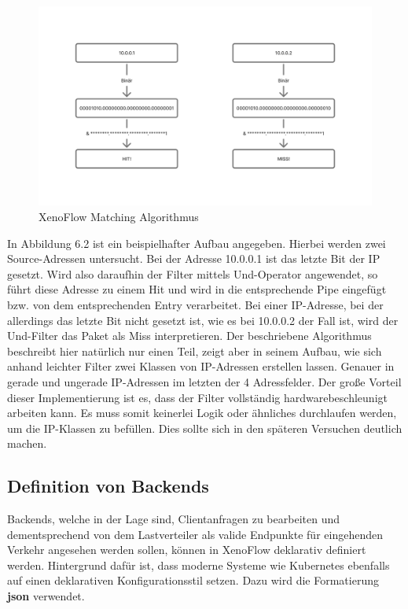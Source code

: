 \begin{figure}
    \centering
    \includegraphics[width=1.1\linewidth]{images/Filter Matching.png}
    \caption{XenoFlow Matching Algorithmus}
    \label{fig:enter-label}
\end{figure}
In Abbildung 6.2 ist ein beispielhafter Aufbau angegeben. Hierbei werden zwei Source-Adressen untersucht. Bei der Adresse 10.0.0.1 ist das letzte Bit der IP gesetzt. Wird also daraufhin der Filter mittels Und-Operator angewendet, so führt diese Adresse zu einem Hit und wird in die entsprechende Pipe eingefügt bzw. von dem entsprechenden Entry verarbeitet. Bei einer IP-Adresse, bei der allerdings das letzte Bit nicht gesetzt ist, wie es bei 10.0.0.2 der Fall ist, wird der Und-Filter das Paket als Miss interpretieren. Der beschriebene Algorithmus beschreibt hier natürlich nur einen Teil, zeigt aber in seinem Aufbau, wie sich anhand leichter Filter zwei Klassen von IP-Adressen erstellen lassen. Genauer in gerade und ungerade IP-Adressen im letzten der 4 Adressfelder. Der große Vorteil dieser Implementierung ist es, dass der Filter vollständig hardwarebeschleunigt arbeiten kann. Es muss somit keinerlei Logik oder ähnliches durchlaufen werden, um die IP-Klassen zu befüllen. Dies sollte sich in den späteren Versuchen deutlich machen.
\subsection{Definition von Backends}
Backends, welche in der Lage sind, Clientanfragen zu bearbeiten und dementsprechend von dem Lastverteiler als valide Endpunkte für eingehenden Verkehr angesehen werden sollen, können in XenoFlow deklarativ definiert werden. Hintergrund dafür ist, dass moderne Systeme wie Kubernetes ebenfalls auf einen deklarativen Konfigurationsstil setzen. Dazu wird die Formatierung \textbf{json} verwendet. 

